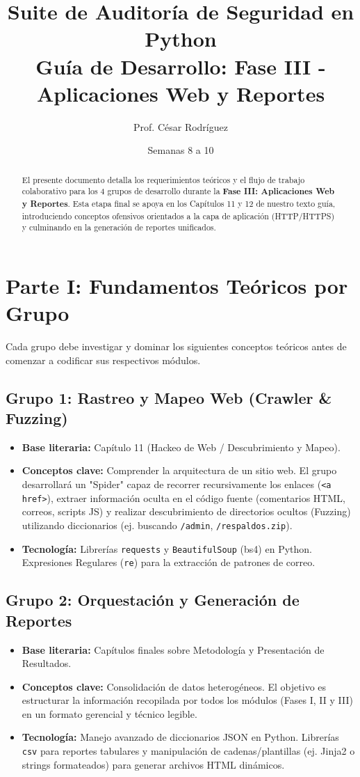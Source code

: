 \documentclass[12pt,letterpaper]{article}
\title{\textbf{Suite de Auditoría de Seguridad en Python}\\ \Large Guía de Desarrollo: Fase III - Aplicaciones Web y Reportes}
\author{Prof. César Rodríguez}
\date{Semanas 8 a 10}
\begin{document}
\maketitle

\begin{abstract}
El presente documento detalla los requerimientos teóricos y el flujo de trabajo colaborativo para los 4 grupos de desarrollo durante la \textbf{Fase III: Aplicaciones Web y Reportes}. Esta etapa final se apoya en los Capítulos 11 y 12 de nuestro texto guía, introduciendo conceptos ofensivos orientados a la capa de aplicación (HTTP/HTTPS) y culminando en la generación de reportes unificados.
\end{abstract}

\section{Parte I: Fundamentos Teóricos por Grupo}
Cada grupo debe investigar y dominar los siguientes conceptos teóricos antes de comenzar a codificar sus respectivos módulos.

\subsection*{Grupo 1: Rastreo y Mapeo Web (Crawler \& Fuzzing)}
\begin{itemize}
    \item \textbf{Base literaria:} Capítulo 11 (Hackeo de Web / Descubrimiento y Mapeo).
    \item \textbf{Conceptos clave:} Comprender la arquitectura de un sitio web. El grupo desarrollará un "Spider" capaz de recorrer recursivamente los enlaces (\texttt{<a href>}), extraer información oculta en el código fuente (comentarios HTML, correos, scripts JS) y realizar descubrimiento de directorios ocultos (Fuzzing) utilizando diccionarios (ej. buscando \texttt{/admin}, \texttt{/respaldos.zip}).
    \item \textbf{Tecnología:} Librerías \texttt{requests} y \texttt{BeautifulSoup} (bs4) en Python. Expresiones Regulares (\texttt{re}) para la extracción de patrones de correo.
\end{itemize}

\subsection*{Grupo 2: Orquestación y Generación de Reportes}
\begin{itemize}
    \item \textbf{Base literaria:} Capítulos finales sobre Metodología y Presentación de Resultados.
    \item \textbf{Conceptos clave:} Consolidación de datos heterogéneos. El objetivo es estructurar la información recopilada por todos los módulos (Fases I, II y III) en un formato gerencial y técnico legible.
    \item \textbf{Tecnología:} Manejo avanzado de diccionarios JSON en Python. Librerías \texttt{csv} para reportes tabulares y manipulación de cadenas/plantillas (ej. Jinja2 o strings formateados) para generar archivos HTML dinámicos.
\end{itemize}
\end{document}

